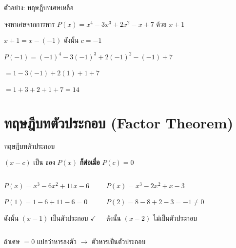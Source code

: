 \documentclass[11pt, aspectratio=169]{beamer}
\begin{document}
\begin{frame}{ตัวอย่าง: ทฤษฎีบทเศษเหลือ}
  \begin{exambox}[โจทย์]
    จงหาเศษจากการหาร $P(x) = x^4 - 3x^3 + 2x^2 - x + 7$ ด้วย $x + 1$
  \end{exambox}

  \begin{solbox}[วิธีทำ]
    $x + 1 = x - (-1)$ ดังนั้น $c = -1$

    $P(-1) = (-1)^4 - 3(-1)^3 + 2(-1)^2 - (-1) + 7$

    $= 1 - 3(-1) + 2(1) + 1 + 7$

    $= 1 + 3 + 2 + 1 + 7 = 14$

  \end{solbox}
\end{frame}

\section{ทฤษฎีบทตัวประกอบ (Factor Theorem)}

\begin{frame}{ทฤษฎีบทตัวประกอบ}
  \begin{explanation}[ทฤษฎีบท]
    $(x - c)$ เป็น  ของ $P(x)$ \textbf{ก็ต่อเมื่อ} $P(c) = 0$
  \end{explanation}

  \begin{columns}[T]
      \begin{exambox}
        $P(x) = x^3 - 6x^2 + 11x - 6$

        $P(1) = 1 - 6 + 11 - 6 = 0$

        ดังนั้น $(x-1)$ เป็นตัวประกอบ $\checkmark$
      \end{exambox}
      \begin{exambox}
        $P(x) = x^3 - 2x^2 + x - 3$

        $P(2) = 8 - 8 + 2 - 3 = -1 \neq 0$

        ดังนั้น $(x-2)$ ไม่เป็นตัวประกอบ
      \end{exambox}
  \end{columns}

  \begin{intuition}
    ถ้าเศษ $= 0$ แปลว่าหารลงตัว $\rightarrow$ ตัวหารเป็นตัวประกอบ
  \end{intuition}
\end{frame}
\end{document}
